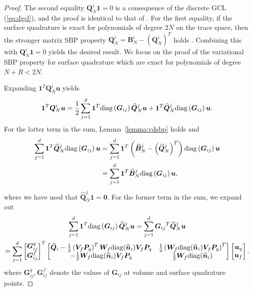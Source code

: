 \documentclass[review]{siamart0216}
\theoremstyle{assumption}
\renewcommand{\hat}[1]{\hat{#1}}
\newcommand{\LRp}[1]{\left( #1 \right)}
\renewcommand{\hat}{\widehat}
\newcommand{\diag}[1]{{\rm diag}\LRp{#1}}
\begin{document}
\begin{proof}
The second equality $\bm{Q}^i_N \bm{1} = 0$ is a consequence of the discrete GCL (\ref{eq:dgcl}), and the proof is identical to that of \cite{chan2018discretely}.  For the first equality, if the surface quadrature is exact for polynomials of degree $2N$ on the trace space, then the stronger matrix SBP property $\bm{Q}^i_N = \bm{B}^i_N - \LRp{\bm{Q}^i_N}^T$ holds \cite{chan2018discretely}.  Combining this with $\bm{Q}^i_N\bm{1} = 0$ yields the desired result.  We focus on the proof of the variational SBP property for surface quadrature which are exact for polynomials of degree $N+R < 2N$.  

Expanding $\bm{1}^T\bm{Q}^i_N\bm{u}$ yields
\[
\bm{1}^T\bm{Q}^i_N\bm{u} = \frac{1}{2}\sum_{j=1}^d \bm{1}^T \diag{\bm{G}_{ij}} \hat{\bm{Q}}^j_N \bm{u} + \bm{1}^T\hat{\bm{Q}}^j_N \diag{\bm{G}_{ij}} \bm{u}. %
\]
For the latter term in the sum, Lemma~\ref{lemma:vdsbp} holds and
\begin{align}
\sum_{j=1}^d\bm{1}^T\hat{\bm{Q}}^j_N \diag{\bm{G}_{ij}} \bm{u} &= 
\sum_{j=1}^d\bm{1}^T\LRp{\hat{\bm{B}}^j_N - \LRp{\hat{\bm{Q}}^j_N}^T} \diag{\bm{G}_{ij}} \bm{u} \\
&= \sum_{j=1}^d\bm{1}^T\hat{\bm{B}}^j_N\diag{\bm{G}_{ij}}\bm{u}, \nonumber
\label{eq:vsbp1}
\end{align}
where we have used that $\hat{\bm{Q}}^j_N \bm{1} = \bm{0}$.  For the former term in the sum, we expand out 
\begin{gather}
\sum_{j=1}^d\bm{1}^T \diag{\bm{G}_{ij}} \hat{\bm{Q}}^j_N \bm{u} = 
\sum_{j=1}^d{\bm{G}_{ij}}^T \hat{\bm{Q}}^j_N \bm{u} \\
= \sum_{j=1}^d\begin{bmatrix}
\bm{G}^q_{ij}\\
\bm{G}^f_{ij}
\end{bmatrix}^T \begin{bmatrix} 
\hat{\bm{Q}}_i - \frac{1}{2}\LRp{\bm{V}_f \bm{P}_q}^T  \bm{W}_f{\rm diag}(\hat{\bm{n}}_i) \bm{V}_f\bm{P}_q &  \frac{1}{2}\LRp{\bm{W}_f{\rm diag}(\hat{\bm{n}}_i)\bm{V}_f\bm{P}_q}^T\label{eq:ibpg}\\
-\frac{1}{2}\bm{W}_f{\rm diag}(\hat{\bm{n}}_i)\bm{V}_f\bm{P}_q & \frac{1}{2}\bm{W}_f{\rm diag}(\hat{\bm{n}}_i)
\end{bmatrix} \begin{bmatrix}\bm{u}_q\\
\bm{u}_f\end{bmatrix}.\nonumber
\end{gather}
where $\bm{G}^q_{ij},\bm{G}^f_{ij}$ denote the values of $\bm{G}_{ij}$ at volume and surface quadrature points.  


\end{proof}
\end{document}
